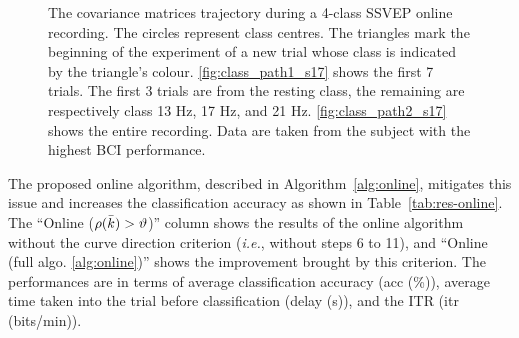 %        
\begin{figure}[h!]
\begin{adjustbox}{center}
\end{adjustbox}
\caption{The covariance matrices trajectory during a 4-class SSVEP online recording. The circles represent class centres. The triangles mark the beginning of the experiment of a new trial whose class is indicated by the triangle's colour. \ref{fig:class_path1_s17} shows the first 7 trials. The first 3 trials are from the resting class, the remaining are respectively class 13 Hz, 17 Hz, and 21 Hz. \ref{fig:class_path2_s17} shows the entire recording. Data are taken from the subject with the highest BCI performance.}
\label{fig:class_path_s17}
\end{figure}


The proposed online algorithm, described in Algorithm~\ref{alg:online}, mitigates this issue and increases the classification accuracy as shown in Table~\ref{tab:res-online}.  %
The ``Online ($\rho(\bar{k})>\vartheta$)'' column shows the results of the online algorithm without the curve direction criterion (\textit{i.e.}, without steps 6 to 11), and ``Online (full algo. \ref{alg:online})'' shows the improvement brought by this criterion. 
The performances are in terms of average classification accuracy (acc (\%)), average time taken into the trial before classification (delay (s)), and the ITR (itr (bits/min)).  

